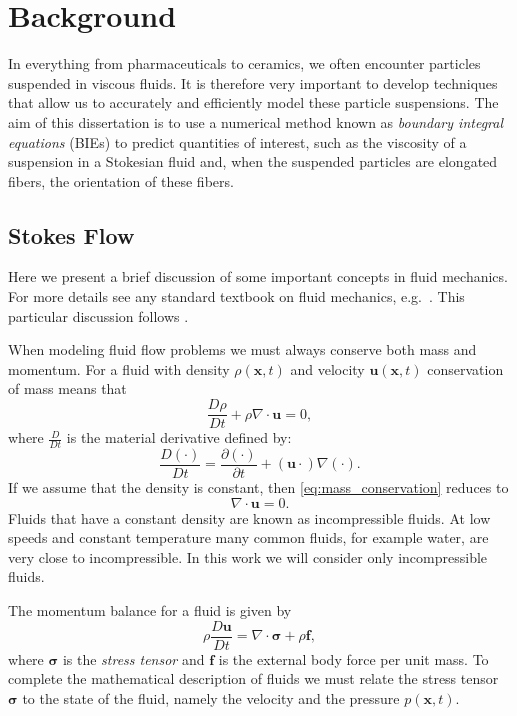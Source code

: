 \chapter{Background}

In everything from pharmaceuticals to ceramics, we often encounter particles suspended in viscous fluids. It is therefore very important to develop techniques that allow us to accurately and efficiently model these particle suspensions. The aim of this dissertation is to use a numerical method known as \textit{boundary integral equations} (BIEs) to predict quantities of interest, such as the viscosity of a suspension in a Stokesian fluid and, when the suspended particles are elongated fibers, the orientation of these fibers. 


\section{Stokes Flow}\label{sec:stokes}

Here we present a brief discussion of some important concepts in fluid mechanics. For more details see any standard textbook on fluid mechanics, e.g.~\cite{Kundu2008, Landau1959}. This particular discussion follows \cite{Karrila1991}. 

When modeling fluid flow problems we must always conserve both mass and momentum. For a fluid with density $\rho(\mathbf{x},t)$ and velocity $\mathbf{u}(\mathbf{x},t)$ conservation of mass means that
\begin{equation}\label{eq:mass_conservation}
	\frac{D\rho}{D t} + \rho\nabla\cdot\mathbf{u} = 0,
\end{equation}
where $\frac{D}{D t}$ is the material derivative defined by:
\[ \frac{D(\cdot)}{D t} = \frac{\partial (\cdot)}{\partial t} +(\mathbf{u}\cdot)\nabla(\cdot).\]
If we assume that the density is constant, then \eqref{eq:mass_conservation} reduces to
\begin{equation}\label{eq:incompressible}
	\nabla\cdot\mathbf{u} = 0.
\end{equation}
Fluids that have a constant density are known as incompressible fluids. At low speeds and constant temperature many common fluids, for example water, are very close to incompressible. In this work we will consider only incompressible fluids. 

The momentum balance for a fluid is given by
\begin{equation}\label{eq:momentum_conservation} \rho\frac{D\mathbf{u}}{D t} = \nabla\cdot\mathbf{\pmb{\sigma}} + \rho\mathbf{f},\end{equation}
where $\pmb{\sigma}$ is the \textit{stress tensor} and $\mathbf{f}$ is the external body force per unit mass. To complete the mathematical description of fluids we must relate the stress tensor $\pmb{\sigma}$ to the state of the fluid, namely the velocity and the pressure $p(\mathbf{x},t)$.

